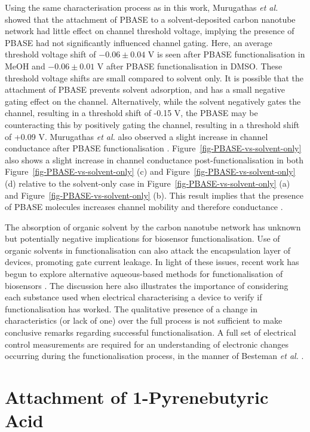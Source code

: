 \documentclass[
  a4paper,
]{scrbook}
\begin{document}
Using the same characterisation process as in this work, Murugathas
\emph{et al.} \autocite{Murugathas2019a} showed that the attachment of
PBASE to a solvent-deposited carbon nanotube network had little effect
on channel threshold voltage, implying the presence of PBASE had not
significantly influenced channel gating. Here, an average threshold
voltage shift of \(-0.06\pm0.04\) V is seen after PBASE
functionalisation in MeOH and \(-0.06\pm0.01\) V after PBASE
functionalisation in DMSO. These threshold voltage shifts are small
compared to solvent only. It is possible that the attachment of PBASE
prevents solvent adsorption, and has a small negative gating effect on
the channel. Alternatively, while the solvent negatively gates the
channel, resulting in a threshold shift of -0.15 V, the PBASE may be
counteracting this by positively gating the channel, resulting in a
threshold shift of +0.09 V. Murugathas \emph{et al.} also observed a
slight increase in channel conductance after PBASE functionalisation
\autocite{Murugathas2019a}. Figure~\ref{fig-PBASE-vs-solvent-only} also
shows a slight increase in channel conductance post-functionalisation in
both Figure~\ref{fig-PBASE-vs-solvent-only} (c) and
Figure~\ref{fig-PBASE-vs-solvent-only} (d) relative to the solvent-only
case in Figure~\ref{fig-PBASE-vs-solvent-only} (a) and
Figure~\ref{fig-PBASE-vs-solvent-only} (b). This result implies that the
presence of PBASE molecules increases channel mobility and therefore
conductance \autocite{Heller2008}.

The absorption of organic solvent by the carbon nanotube network has
unknown but potentially negative implications for biosensor
functionalisation. Use of organic solvents in functionalisation can also
attack the encapsulation layer of devices, promoting gate current
leakage. In light of these issues, recent work has begun to explore
alternative aqueous-based methods for functionalisation of biosensors
\autocite{Khan2021}. The discussion here also illustrates the importance
of considering each substance used when electrical characterising a
device to verify if functionalisation has worked. The qualitative
presence of a change in characteristics (or lack of one) over the full
process is not sufficient to make conclusive remarks regarding
successful functionalisation. A full set of electrical control
measurements are required for an understanding of electronic changes
occurring during the functionalisation process, in the manner of
Besteman \emph{et al.} \autocite{Besteman2003}.

\hypertarget{sec-PBA}{%
\section{Attachment of 1-Pyrenebutyric Acid}\label{sec-PBA}}
\end{document}
